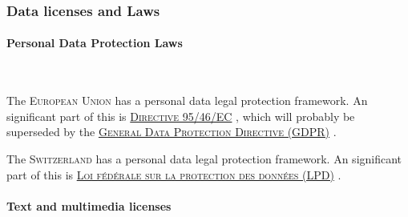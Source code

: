 \subsubsection{Data licenses and Laws}

\paragraph{Personal Data Protection Laws}

~

\noindent {} The \textsc{European Union} has a personal data legal protection framework. An significant part of this is \textsc{\href{http://eur-lex.europa.eu/LexUriServ/LexUriServ.do?uri=CELEX:31995L0046:en:HTML}{Directive 95/46/EC}} \cite{eurlex_9546ec_1995}, which will probably be superseded by the \textsc{\href{https://en.wikipedia.org/wiki/General_Data_Protection_Regulation}{General Data Protection Directive (GDPR)}} \cite{wikipedia_general_2015}.

\vspace{0.4cm}

\noindent {} The \textsc{Switzerland} has a personal data legal protection framework. An significant part of this is \textsc{\href{https://www.admin.ch/opc/fr/classified-compilation/19920153/}{Loi fédérale sur la protection des données (LPD)}} \cite{admin.ch_rs_1992} .


\paragraph{Text and multimedia licenses}

~

